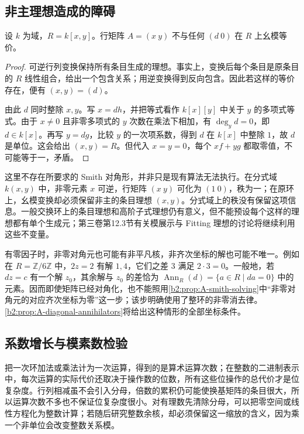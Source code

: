 \subsection{非主理想造成的障碍}
\label{b2:subsec:A02:02}

\begin{proposition}\label{b2:prop:A-nonprincipal-obstruction}
	设 \(k\) 为域，\(R=k[x,y]\)。行矩阵 \(A=(x\ y)\) 不与任何 \((d\ 0)\) 在 \(R\) 上幺模等价。
\end{proposition}
\begin{proof}
	可逆行列变换保持所有条目生成的理想。事实上，变换后每个条目是原条目的 \(R\) 线性组合，给出一个包含关系；用逆变换得到反向包含。因此若这样的等价存在，便有 \((x,y)=(d)\)。

	由此 \(d\) 同时整除 \(x,y\)。写 \(x=dh\)，并把等式看作 \(k[x][y]\) 中关于 \(y\) 的多项式等式。由于 \(x\ne0\) 且非零多项式的 \(y\) 次数在乘法下相加，有 \(\deg_y d=0\)，即 \(d\in k[x]\)。再写 \(y=dg\)，比较 \(y\) 的一次项系数，得到 \(d\) 在 \(k[x]\) 中整除 \(1\)，故 \(d\) 是单位。这会给出 \((x,y)=R\)。但代入 \(x=y=0\)，每个 \(xf+yg\) 都取零值，不可能等于一，矛盾。
\end{proof}

这里不存在所要求的 Smith 对角形，并非只是现有算法无法执行。在分式域 \(k(x,y)\) 中，非零元素 \(x\) 可逆，行矩阵 \((x\ y)\) 可化为 \((1\ 0)\)，秩为一；在原环上，幺模变换却必须保留非主的条目理想 \((x,y)\)。分式域上的秩没有保留这项信息。一般交换环上的条目理想和高阶子式理想仍有意义，但不能预设每个这样的理想都有单个生成元；第三卷第12.3节有关模展示与 Fitting 理想的讨论将继续利用这些不变量。

\ProseParagraphBreak
有零因子时，非零对角元也可能有非平凡核，非齐次坐标的解也可能不唯一。例如在 \(R=\mathbb Z/6\mathbb Z\) 中，\(2z=2\) 有解 \(1,4\)，它们之差 \(3\) 满足 \(2\cdot3=0\)。一般地，若 \(dz=c\) 有一个解 \(z_0\)，其余解与 \(z_0\) 的差恰为 \(\operatorname{Ann}_R(d)=\{a\in R\mid da=0\}\) 中的元素。因而即使矩阵已经对角化，也不能照用\cref{b2:prop:A-smith-solving}中“非零对角元的对应齐次坐标为零”这一步；该步明确使用了整环的非零消去律。\cref{b2:prop:A-diagonal-annihilators}将给出这种情形的全部坐标条件。

\subsection{系数增长与模素数检验}
\label{b2:subsec:A02:03}

把一次环加法或乘法计为一次运算，得到的是算术运算次数；在整数的二进制表示中，每次运算的实际代价还取决于操作数的位数，所有这些位操作的总代价才是位复杂度。行列相减虽不会引入分母，倍数的累积仍可能使换基矩阵的条目很大，所以运算次数不多也不保证位复杂度很小。对有理数先清除分母，可以把零空间或线性方程化为整数计算；若随后研究整数余核，却必须保留这一缩放的含义，因为乘一个非单位会改变整数关系模。

